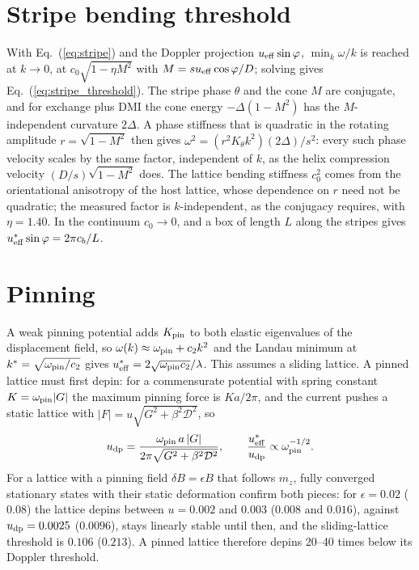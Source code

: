 \documentclass[prb,reprint,amsmath,amssymb,superscriptaddress,floatfix]{revtex4-2}
\newcommand{\ueff}{u_{\rm eff}}
\newcommand{\Dm}{\mathcal D}
\begin{document}
\section{Stripe bending threshold}
\label{app:stripe}

With Eq.~(\ref{eq:stripe}) and the Doppler projection $\ueff\sin\varphi$, $\min_k\omega/k$ is reached at $k\to0$, at $c_0\sqrt{1-\eta M^2}$ with $M=s\ueff\cos\varphi/D$; solving gives Eq.~(\ref{eq:stripe_threshold}). The stripe phase $\theta$ and the cone $M$ are conjugate, and for exchange plus DMI the cone energy $-\Delta(1-M^2)$ has the $M$-independent curvature $2\Delta$. A phase stiffness that is quadratic in the rotating amplitude $r=\sqrt{1-M^2}$ then gives $\omega^2=(r^2K_\theta k^2)(2\Delta)/s^2$: every such phase velocity scales by the same factor, independent of $k$, as the helix compression velocity $(D/s)\sqrt{1-M^2}$ does. The lattice bending stiffness $c_0^2$ comes from the orientational anisotropy of the host lattice, whose dependence on $r$ need not be quadratic; the measured factor is $k$-independent, as the conjugacy requires, with $\eta=1.40$. In the continuum $c_0\to0$, and a box of length $L$ along the stripes gives $\ueff^*\sin\varphi=2\pi c_b/L$.

\section{Pinning}
\label{app:pinning}

A weak pinning potential adds $K_{\rm pin}$ to both elastic eigenvalues of the displacement field, so $\omega(k)\approx\omega_{\rm pin}+c_2k^2$ and the Landau minimum at $k^*=\sqrt{\omega_{\rm pin}/c_2}$ gives $\ueff^*=2\sqrt{\omega_{\rm pin}c_2}/\lambda$. This assumes a sliding lattice. A pinned lattice must first depin: for a commensurate potential with spring constant $K=\omega_{\rm pin}|G|$ the maximum pinning force is $Ka/2\pi$, and the current pushes a static lattice with $|F|=u\sqrt{G^2+\beta^2\Dm^2}$, so
\begin{equation}
u_{\rm dp}=\frac{\omega_{\rm pin}\,a\,|G|}{2\pi\sqrt{G^2+\beta^2\Dm^2}},\qquad \frac{\ueff^*}{u_{\rm dp}}\propto\omega_{\rm pin}^{-1/2}.
\end{equation}
For a lattice with a pinning field $\delta B=\epsilon B$ that follows $m_z$, fully converged stationary states with their static deformation confirm both pieces: for $\epsilon=0.02$ ($0.08$) the lattice depins between $u=0.002$ and $0.003$ ($0.008$ and $0.016$), against $u_{\rm dp}=0.0025$ ($0.0096$), stays linearly stable until then, and the sliding-lattice threshold is $0.106$ ($0.213$). A pinned lattice therefore depins 20--40 times below its Doppler threshold.
\end{document}
